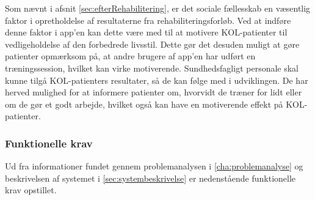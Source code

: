 Som nævnt i afsnit \ref{sec:efterRehabilitering}, er det sociale fællesskab en væsentlig faktor i opretholdelse af resultaterne fra rehabiliteringsforløb. Ved at indføre denne faktor i app’en kan dette være med til at motivere KOL-patienter til vedligeholdelse af den forbedrede livsstil. Dette gør det desuden muligt at gøre patienter opmærksom på, at andre brugere af app’en har udført en træningssession, hvilket kan virke motiverende.
Sundhedsfagligt personale skal kunne tilgå KOL-patienters resultater, så de kan følge med i udviklingen. De har herved mulighed for at informere patienter om, hvorvidt de træner for lidt eller om de gør et godt arbejde, hvilket også kan have en motiverende effekt på KOL-patienter.

\subsubsection{Funktionelle krav}
Ud fra informationer fundet gennem problemanalysen i \autoref{cha:problemanalyse} og beskrivelsen af systemet i \autoref{sec:systembeskrivelse} er nedenstående funktionelle krav opstillet. 
  
